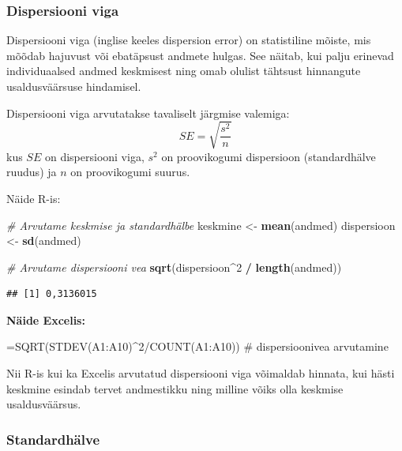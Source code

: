 \documentclass[
]{book}
\newenvironment{Shaded}{\begin{snugshade}}{\end{snugshade}}
\newcommand{\CommentTok}[1]{\textcolor[rgb]{0.56,0.35,0.01}{\textit{#1}}}
\newcommand{\DecValTok}[1]{\textcolor[rgb]{0.00,0.00,0.81}{#1}}
\newcommand{\FunctionTok}[1]{\textcolor[rgb]{0.13,0.29,0.53}{\textbf{#1}}}
\newcommand{\NormalTok}[1]{#1}
\newcommand{\OtherTok}[1]{\textcolor[rgb]{0.56,0.35,0.01}{#1}}
\newcommand{\SpecialCharTok}[1]{\textcolor[rgb]{0.81,0.36,0.00}{\textbf{#1}}}
\renewenvironment{Shaded} {\begin{snugshade}\footnotesize} {\end{snugshade}}
\begin{document}
\subsubsection{Dispersiooni viga}\label{dispersiooni-viga}

Dispersiooni viga (inglise keeles dispersion error) on statistiline mõiste, mis mõõdab hajuvust või ebatäpsust andmete hulgas. See näitab, kui palju erinevad individuaalsed andmed keskmisest ning omab olulist tähtsust hinnangute usaldusväärsuse hindamisel.

Dispersiooni viga arvutatakse tavaliselt järgmise valemiga:
\[ SE = \sqrt{\frac{s^2}{n}} \]
kus \(SE\) on dispersiooni viga, \(s^2\) on proovikogumi dispersioon (standardhälve ruudus) ja \(n\) on proovikogumi suurus.

Näide R-is:

\begin{Shaded}
\begin{Highlighting}[]
\CommentTok{\# Arvutame keskmise ja standardhälbe}
\NormalTok{keskmine }\OtherTok{\textless{}{-}} \FunctionTok{mean}\NormalTok{(andmed)}
\NormalTok{dispersioon }\OtherTok{\textless{}{-}} \FunctionTok{sd}\NormalTok{(andmed)}

\CommentTok{\# Arvutame dispersiooni vea}
\FunctionTok{sqrt}\NormalTok{(dispersioon}\SpecialCharTok{\^{}}\DecValTok{2} \SpecialCharTok{/} \FunctionTok{length}\NormalTok{(andmed))}
\end{Highlighting}
\end{Shaded}

\begin{verbatim}
## [1] 0,3136015
\end{verbatim}

\textbf{Näide Excelis:}

\begin{Shaded}
\begin{Highlighting}[]
\NormalTok{=SQRT(STDEV(A1:A10)\^{}2/COUNT(A1:A10)) \# dispersioonivea arvutamine}
\end{Highlighting}
\end{Shaded}

Nii R-is kui ka Excelis arvutatud dispersiooni viga võimaldab hinnata, kui hästi keskmine esindab tervet andmestikku ning milline võiks olla keskmise usaldusväärsus.

\subsubsection{Standardhälve}\label{standardhuxe4lve}
\end{document}
